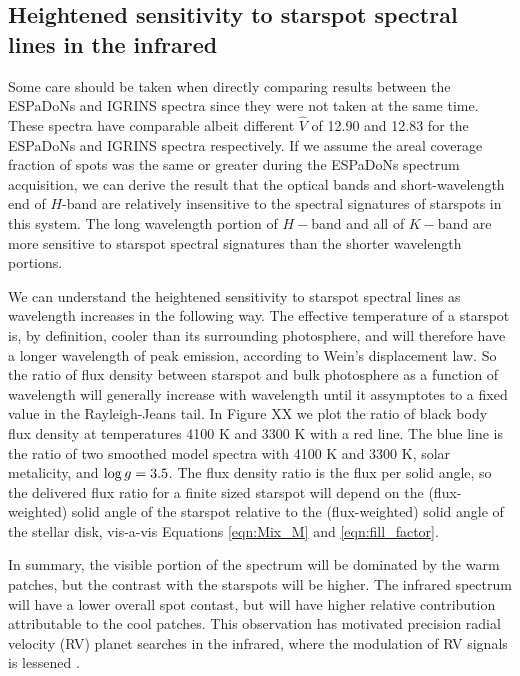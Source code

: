 \documentclass[twocolumn]{emulateapj}%
\begin{document}
\subsection{Heightened sensitivity to starspot spectral lines in the infrared}

Some care should be taken when directly comparing results between the ESPaDoNs and IGRINS spectra since they were not taken at the same time.  These spectra have comparable albeit different $\hat V$ of 12.90 and 12.83 for the ESPaDoNs and IGRINS spectra respectively.  If we assume the areal coverage fraction of spots was the same or greater during the ESPaDoNs spectrum acquisition, we can derive the result that the optical bands and short-wavelength end of $H$-band are relatively insensitive to the spectral signatures of starspots in this system.  The long wavelength portion of $H-$band and all of $K-$band are more sensitive to starspot spectral signatures than the shorter wavelength portions.

We can understand the heightened sensitivity to starspot spectral lines as wavelength increases in the following way.  The effective temperature of a starspot is, by definition, cooler than its surrounding photosphere, and will therefore have a longer wavelength of peak emission, according to Wein's displacement law.  So the ratio of flux density between starspot and bulk photosphere as a function of wavelength will generally increase with wavelength until it assymptotes to a fixed value in the Rayleigh-Jeans tail.  In Figure XX we plot the ratio of black body flux density at temperatures 4100 K and 3300 K with a red line.  The blue line is the ratio of two smoothed \PHOENIX model spectra with 4100 K and 3300 K, solar metalicity, and $\log g=3.5$.  The flux density ratio is the flux per solid angle, so the delivered flux ratio for a finite sized starspot will depend on the (flux-weighted) solid angle of the starspot relative to the (flux-weighted) solid angle of the stellar disk, vis-a-vis Equations \ref{eqn:Mix_M} and \ref{eqn:fill_factor}.  



In summary, the visible portion of the spectrum will be dominated by the warm patches, but the contrast with the starspots will be higher.  The infrared spectrum will have a lower overall spot contast, but will have higher relative contribution attributable to the cool patches.  This observation has motivated precision radial velocity (RV) planet searches in the infrared, where the modulation of RV signals is lessened \citep{prato08}.
\end{document}
